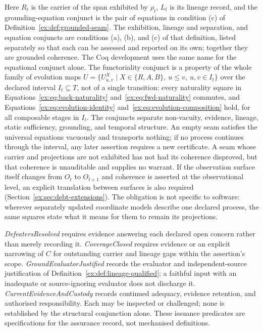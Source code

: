 \documentclass[11pt]{article}
\theoremstyle{definition}
\begin{document}
Here $R_t$ is the carrier of the span exhibited by $\rho_t$, $L_t$ is its lineage record, and the grounding-equation conjunct is the pair of equations in condition (c) of Definition~\ref{ex:def:grounded-seam}. The exhibition, lineage and separation, and equation conjuncts are conditions (a), (b), and (c) of that definition, listed separately so that each can be assessed and reported on its own; together they are grounded coherence. The Coq development uses the same name for the equational conjunct alone. The functoriality conjunct is a property of the whole family of evolution maps $U=\{U^X_{u,v}\mid X\in\{R,A,B\},\ u\leq v,\ u,v\in I_t\}$ over the declared interval $I_t\subseteq T$, not of a single transition: every naturality square in Equations~\eqref{ex:eq:back-naturality} and~\eqref{ex:eq:fwd-naturality} commutes, and Equations~\eqref{ex:eq:evolution-identity} and~\eqref{ex:eq:evolution-composition} hold, for all composable stages in $I_t$. The conjuncts separate non-vacuity, evidence, lineage, static sufficiency, grounding, and temporal structure. An empty seam satisfies the universal equations vacuously and transports nothing; if no process continues through the interval, any later assertion requires a new certificate. A seam whose carrier and projections are not exhibited has not had its coherence disproved, but that coherence is unauditable and supplies no warrant. If the observation surface itself changes from $O_t$ to $O_{t+1}$ and coherence is asserted at the observational level, an explicit translation between surfaces is also required (Section~\ref{ex:sec:debt-extensions}). The obligation is not specific to software: wherever separately updated coordinate models describe one declared process, the same squares state what it means for them to remain its projections.

\emph{DefeatersResolved} requires evidence answering each declared open concern rather than merely recording it. \emph{CoverageClosed} requires evidence or an explicit narrowing of $C$ for outstanding carrier and lineage gaps within the assertion's scope. \emph{GroundEvaluatorJustified} records the evaluator and independent-source justification of Definition~\ref{ex:def:lineage-qualified}; a faithful input with an inadequate or source-ignoring evaluator does not discharge it. \emph{CurrentEvidenceAndCustody} records continued adequacy, evidence retention, and authorised responsibility. Each may be inspected or challenged; none is established by the structural conjunction alone. These issuance predicates are specifications for the assurance record, not mechanised definitions.
\end{document}
